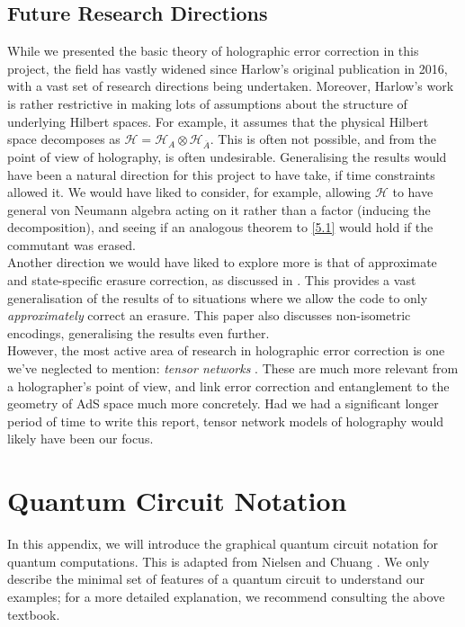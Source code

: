 \documentclass[12pt,a4paper]{report}
\numberwithin{equation}{section}
\newcommand{\ol}[1]{\overline{#1}}
\theoremstyle{definition}
\theoremstyle{theorem}
\theoremstyle{theorem}
\theoremstyle{example}
\theoremstyle{definition}
\begin{document}
\section{Future Research Directions}
While we presented the basic theory of holographic error correction in this project, the field has vastly widened since Harlow's original publication in 2016, with a vast set of research directions being undertaken. Moreover, Harlow's work is rather restrictive in making lots of assumptions about the structure of underlying Hilbert spaces. For example, it assumes that the physical Hilbert space decomposes as $\mathcal{H}=\mathcal{H}_{A}\otimes\mathcal{H}_{\ol{A}}$. This is often not possible, and from the point of view of holography, is often undesirable. Generalising the results would have been a natural direction for this project to have take, if time constraints allowed it. We would have liked to consider, for example, allowing $\mathcal{H}$ to have general von Neumann algebra acting on it rather than a factor (inducing the decomposition), and seeing if an analogous theorem to \ref{5.1} would hold if the commutant was erased.\\
Another direction we would have liked to explore more is that of approximate and state-specific erasure correction, as discussed in \cite{QMS}. This provides a vast generalisation of the results of \cite{Harlow} to situations where we allow the code to only \textit{approximately} correct an erasure. This paper also discusses non-isometric encodings, generalising the results even further.\\
However, the most active area of research in holographic error correction is one we've neglected to mention: \textit{tensor networks} \cite{Jahn_2021}. These are much more relevant from a holographer's point of view, and link error correction and entanglement to the geometry of AdS space much more concretely. Had we had a significant longer period of time to write this report, tensor network models of holography would likely have been our focus.

\appendix

\chapter{Quantum Circuit Notation}\label{apa}
In this appendix, we will introduce the graphical quantum circuit notation for quantum computations. This is adapted from Nielsen and Chuang \cite{NielsenChuang}. We only describe the minimal set of features of a quantum circuit to understand our examples; for a more detailed explanation, we recommend consulting the above textbook.
\end{document}
